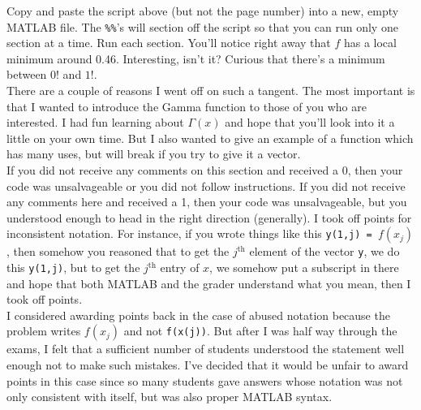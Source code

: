 \documentclass{article}
\begin{document}
Copy and paste the script above (but not the page number) into a new, empty MATLAB file. The \texttt{\%\%}'s will section off the script so that you can run only one section at a time. Run each section. You'll notice right away that $f$ has a local minimum around 0.46. Interesting, isn't it? Curious that there's a minimum between $0!$ and $1!$.\\

There are a couple of reasons I went off on such a tangent. The most important is that I wanted to introduce the Gamma function to those of you who are interested. I had fun learning about $\Gamma (x)$ and hope that you'll look into it a little on your own time. But I also wanted to give an example of a function which has many uses, but will break if you try to give it a vector. \\

If you did not receive any comments on this section and received a 0, then your code was unsalvageable or you did not follow instructions. If you did not receive any comments here and received a 1, then your code was unsalvageable, but you understood enough to head in the right direction (generally). I took off points for inconsistent notation. For instance, if you wrote things like this \texttt{y(1,j) = }$f(x_j)$, then somehow you reasoned that to get the $j^\text{th}$ element of the vector \texttt{y}, we do this \texttt{y(1,j)}, but to get the $j^\text{th}$ entry of $x$, we somehow put a subscript in there and hope that both MATLAB and the grader understand what you mean, then I took off points. \\

I considered awarding points back in the case of abused notation because the problem writes $f(x_j)$ and not \texttt{f(x(j))}. But after I was half way through the exams, I felt that a sufficient number of students understood the statement well enough not to make such mistakes. I've decided that it would be unfair to award points in this case since so many students gave answers whose notation was not only consistent with itself, but was also proper MATLAB syntax.
\end{document}
